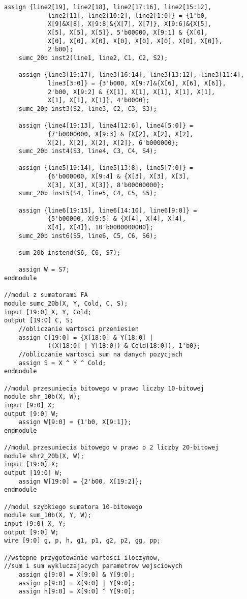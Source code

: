 \documentclass[a4paper]{article}
\begin{document}
\begin{lstlisting}[label=calosc]
	assign {line2[19], line2[18], line2[17:16], line2[15:12],
		    line2[11], line2[10:2], line2[1:0]} = {1'b0,
		    X[9]&X[8], X[9:8]&{X[7], X[7]}, X[9:6]&{X[5],
		    X[5], X[5], X[5]}, 5'b00000, X[9:1] & {X[0],
		    X[0], X[0], X[0], X[0], X[0], X[0], X[0], X[0]},
		    2'b00};
	sumc_20b inst2(line1, line2, C1, C2, S2);
	
	assign {line3[19:17], line3[16:14], line3[13:12], line3[11:4],
		    line3[3:0]} = {3'b000, X[9:7]&{X[6], X[6], X[6]},
		    2'b00, X[9:2] & {X[1], X[1], X[1], X[1], X[1],
		    X[1], X[1], X[1]}, 4'b0000};
	sumc_20b inst3(S2, line3, C2, C3, S3);
	
	assign {line4[19:13], line4[12:6], line4[5:0]} =
		    {7'b0000000, X[9:3] & {X[2], X[2], X[2], 
		    X[2], X[2], X[2], X[2]}, 6'b000000};
	sumc_20b inst4(S3, line4, C3, C4, S4);
	
	assign {line5[19:14], line5[13:8], line5[7:0]} = 
		    {6'b000000, X[9:4] & {X[3], X[3], X[3], 
		    X[3], X[3], X[3]}, 8'b00000000};
	sumc_20b inst5(S4, line5, C4, C5, S5);
	
	assign {line6[19:15], line6[14:10], line6[9:0]} = 
		    {5'b00000, X[9:5] & {X[4], X[4], X[4], 
		    X[4], X[4]}, 10'b0000000000};
	sumc_20b inst6(S5, line6, C5, C6, S6);

	sum_20b instend(S6, C6, S7);

	assign W = S7;
endmodule

//modul z sumatorami FA
module sumc_20b(X, Y, Cold, C, S);
input [19:0] X, Y, Cold;
output [19:0] C, S;
	//obliczanie wartosci przeniesien
	assign C[19:0] = {X[18:0] & Y[18:0] | 
		    ((X[18:0] | Y[18:0]) & Cold[18:0]), 1'b0};
	//obliczanie wartosci sum na danych pozycjach
	assign S = X ^ Y ^ Cold;
endmodule

//modul przesuniecia bitowego w prawo liczby 10-bitowej
module shr_10b(X, W);
input [9:0] X;
output [9:0] W;
	assign W[9:0] = {1'b0, X[9:1]};
endmodule

//modul przesuniecia bitowego w prawo o 2 liczby 20-bitowej
module shr2_20b(X, W);
input [19:0] X;
output [19:0] W;
	assign W[19:0] = {2'b00, X[19:2]};
endmodule

//modul szybkiego sumatora 10-bitowego
module sum_10b(X, Y, W);
input [9:0] X, Y;
output [9:0] W;
wire [9:0] g, p, h, g1, p1, g2, p2, gg, pp;

//wstepne przygotowanie wartosci iloczynow, 
//sum i sum wykluczajacych parametrow wejsciowych
	assign g[9:0] = X[9:0] & Y[9:0];
	assign p[9:0] = X[9:0] | Y[9:0];
	assign h[9:0] = X[9:0] ^ Y[9:0];


\end{lstlisting}
\end{document}
